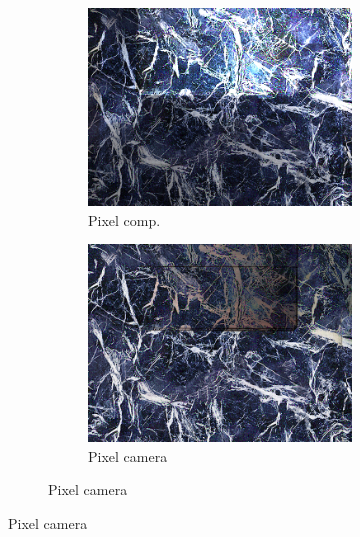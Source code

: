 \begin{figure}[]
\begin{subfigure}{\textwidth}
\begin{subfigure}{0.24\textwidth}
            \includegraphics[width=\textwidth]{images/04-experiment02/carpet/marble/pixel_im.jpg}
            \caption*{Pixel comp.}
        \end{subfigure}
        \hfill
        \begin{subfigure}{0.24\textwidth}
            \centering
            \includegraphics[width=\textwidth]{images/04-experiment02/carpet/marble/pixel_proj.jpg}
            \caption*{Pixel camera}
        \end{subfigure}
    \end{subfigure}


\end{figure}

